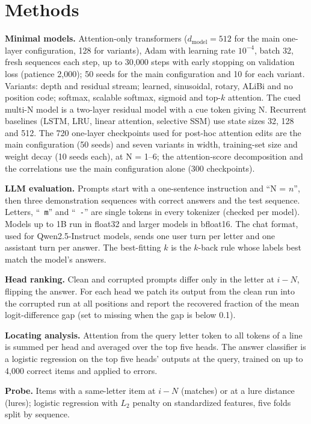 \documentclass{article}
\begin{document}
\section{Methods}
\label{app:methods}

\textbf{Minimal models.} Attention-only transformers ($d_{\text{model}}=512$ for the main one-layer configuration, 128 for variants), Adam with learning rate $10^{-4}$, batch 32, fresh sequences each step, up to 30,000 steps with early stopping on validation loss (patience 2,000); 50 seeds for the main configuration and 10 for each variant. Variants: depth and residual stream; learned, sinusoidal, rotary, ALiBi and no position code; softmax, scalable softmax, sigmoid and top-$k$ attention. The cued multi-N model is a two-layer residual model with a cue token giving N. Recurrent baselines (LSTM, LRU, linear attention, selective SSM) use state sizes 32, 128 and 512. The 720 one-layer checkpoints used for post-hoc attention edits are the main configuration (50 seeds) and seven variants in width, training-set size and weight decay (10 seeds each), at N = 1--6; the attention-score decomposition and the correlations use the main configuration alone (300 checkpoints).

\textbf{LLM evaluation.} Prompts start with a one-sentence instruction and ``N = $n$'', then three demonstration sequences with correct answers and the test sequence. Letters, ``\texttt{ m}'' and ``\texttt{ -}'' are single tokens in every tokenizer (checked per model). Models up to 1B run in float32 and larger models in bfloat16. The chat format, used for Qwen2.5-Instruct models, sends one user turn per letter and one assistant turn per answer. The best-fitting $k$ is the $k$-back rule whose labels best match the model's answers.

\textbf{Head ranking.} Clean and corrupted prompts differ only in the letter at $i-N$, flipping the answer. For each head we patch its output from the clean run into the corrupted run at all positions and report the recovered fraction of the mean logit-difference gap (set to missing when the gap is below 0.1).

\textbf{Locating analysis.} Attention from the query letter token to all tokens of a line is summed per head and averaged over the top five heads. The answer classifier is a logistic regression on the top five heads' outputs at the query, trained on up to 4,000 correct items and applied to errors.

\textbf{Probe.} Items with a same-letter item at $i-N$ (matches) or at a lure distance (lures); logistic regression with $L_2$ penalty on standardized features, five folds split by sequence.
\end{document}
